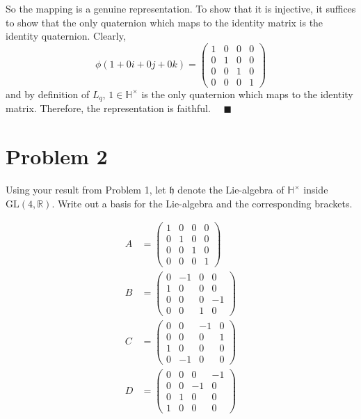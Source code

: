 \documentclass[12pt]{article}
\newcommand{\R}{\mathbb{R}}
\newcommand{\GL}{\text{GL}}
\newcommand{\h}{\mathfrak{h}}
\newcommand{\Ha}{\mathbb{H}}
\newcommand{\qed}{\quad \blacksquare}
\begin{document}
        So the mapping is a genuine representation. To show that it is injective, it suffices to show that the only quaternion which maps to the identity matrix is the identity quaternion. Clearly, 
        \[\phi(1 + 0i + 0j + 0k) = \begin{pmatrix}
            1 & 0 & 0 & 0\\ 
            0 & 1 & 0 & 0\\ 
            0 & 0 & 1 & 0\\ 
            0 & 0 & 0 & 1
        \end{pmatrix}\] 
        and by definition of $L_q$, $1 \in \Ha^{\times}$ is the only quaternion which maps to the identity matrix. Therefore, the representation is faithful. $\qed$
    \color{black}

\pagebreak

\section*{Problem 2} Using your result from Problem 1, let $\h$ denote the Lie-algebra of $\Ha^{\times}$ inside $\GL(4,\R)$.  Write out a basis for the Lie-algebra and the corresponding brackets.

    \color{blue}
        \begin{align*}
            A &= \begin{pmatrix}
                1 & 0 & 0 & 0\\
                0 & 1 & 0 & 0\\
                0 & 0 & 1 & 0\\
                0 & 0 & 0 & 1
            \end{pmatrix}\\ 
            B &= \begin{pmatrix}
                0 & -1 & 0 & 0\\
                1 & 0 & 0 & 0\\
                0 & 0 & 0 & -1\\
                0 & 0 & 1 & 0
            \end{pmatrix}\\
            C &= \begin{pmatrix}
                0 & 0 & -1 & 0\\
                0 & 0 & 0 & 1\\
                1 & 0 & 0 & 0\\
                0 & -1 & 0 & 0
            \end{pmatrix}\\
            D &= \begin{pmatrix}
                0 & 0 & 0 & -1\\
                0 & 0 & -1 & 0\\
                0 & 1 & 0 & 0\\
                1 & 0 & 0 & 0
            \end{pmatrix}
        \end{align*}
\end{document}
